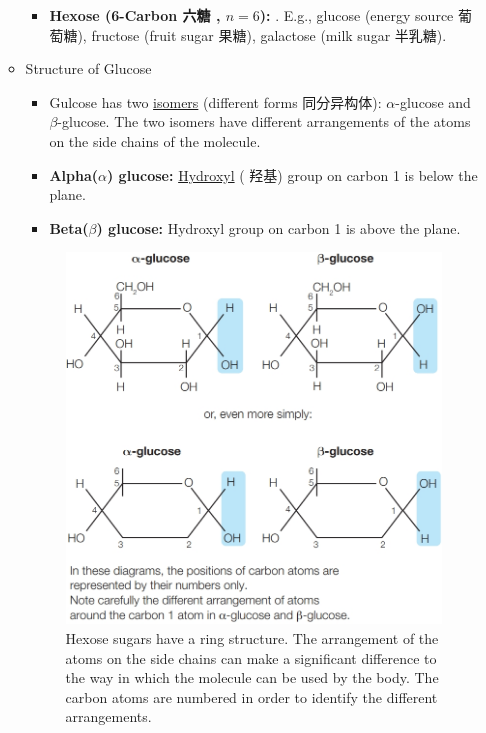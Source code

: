 \begin{itemize}
\begin{itemize}
\begin{itemize}
            \item \textbf{Hexose (6-Carbon 六糖 , $n=6$):} . E.g., glucose (energy source 葡萄糖), fructose (fruit
            sugar 果糖), galactose (milk sugar 半乳糖).
        \end{itemize}
        \item Structure of Glucose
        \begin{itemize}
            \item Gulcose has two \underline{isomers} (different forms 同分异构体): $\alpha$-glucose and $\beta$-glucose. The two
            isomers have different arrangements of the atoms on the side chains of the molecule.
            \item \textbf{Alpha($\alpha$) glucose:} \underline{Hydroxyl} ( 羟基) group on carbon 1 is below the plane.
            \item \textbf{Beta($\beta$) glucose:} Hydroxyl group on carbon 1 is above the plane.
        \end{itemize}
        \begin{figure}[H]
            \centering
            \includegraphics[scale=0.28]{Biology/1A/Images/1A-2-3.png}
            \caption{Hexose sugars have a ring structure. The arrangement of the atoms on the side chains can make a significant
            difference to the way in which the molecule can be used by the body. The carbon atoms are numbered in order to
            identify the different arrangements.}
        \end{figure}
    \end{itemize}
\end{itemize}

